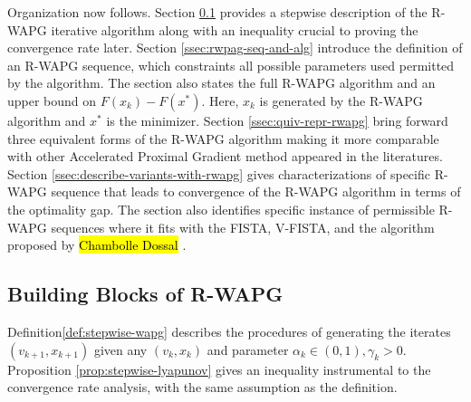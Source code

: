 \documentclass[12pt]{article}
\begin{document}
        Organization now follows. 
        Section \ref{ssec:building-block-rwapg} provides a stepwise description of the R-WAPG iterative algorithm along with an inequality crucial to proving the convergence rate later. 
        Section \ref{ssec:rwpag-seq-and-alg} introduce the definition of an R-WAPG sequence, which constraints all possible parameters used permitted by the algorithm.
        The section also states the full R-WAPG algorithm and an upper bound on $F(x_k) - F(x^*)$. 
        Here, $x_k$ is generated by the R-WAPG algorithm and $x^*$ is the minimizer. 
        Section \ref{ssec:quiv-repr-rwapg} bring forward three equivalent forms of the R-WAPG algorithm making it more comparable with other Accelerated Proximal Gradient method appeared in the literatures. 
        Section \ref{ssec:describe-variants-with-rwapg} gives characterizations of specific R-WAPG sequence that leads to convergence of the R-WAPG algorithm in terms of the optimality gap. 
        The section also identifies specific instance of permissible R-WAPG sequences where it fits with the FISTA, V-FISTA, and the algorithm proposed by 
        {\hl{Chambolle Dossal}} \cite{chambolle_convergence_2015}. 

        
    \subsection{Building Blocks of R-WAPG}\label{ssec:building-block-rwapg}
        Definition\ref{def:stepwise-wapg} describes the procedures of generating the iterates $(v_{k + 1}, x_{k + 1})$ given any $(v_k, x_k)$ and parameter $\alpha_k \in (0, 1), \gamma_k > 0$. 
        Proposition \ref{prop:stepwise-lyapunov} gives an inequality instrumental to the convergence rate analysis, with the same assumption as the definition. 
\end{document}
